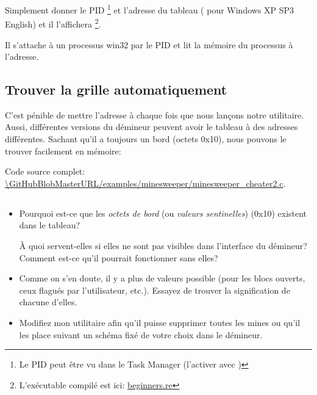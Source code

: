 

Simplement donner le \ac{PID}
\footnote{Le PID peut être vu dans le Task Manager
(l'activer avec )}
et l'adresse du tableau ( pour Windows XP SP3 English)
et il l'affichera
\footnote{L'exécutable compilé est ici:
\href{http://go.yurichev.com/17165}{beginners.re}}.

Il s'attache à un processus win32 par le \ac{PID} et lit la mémoire du processus
à l'adresse.

\subsection{Trouver la grille automatiquement}

C'est pénible de mettre l'adresse à chaque fois que nous lançons notre utilitaire.
Aussi, différentes versions du démineur peuvent avoir le tableau à des adresses différentes.
Sachant qu'il a toujours un bord (octets 0x10), nous pouvons le trouver facilement
en mémoire:



Code source complet: \url{\GitHubBlobMasterURL/examples/minesweeper/minesweeper_cheater2.c}.

\subsection{\Exercises}

\begin{itemize}

\item 
Pourquoi est-ce que les \emph{octets de bord} (ou \emph{valeurs sentinelles}) (0x10)
existent dans le tableau?

À quoi servent-elles si elles ne sont pas visibles dans l'interface du démineur?
Comment est-ce qu'il pourrait fonctionner sans elles?

\item 
Comme on s'en doute, il y a plus de valeurs possible (pour les blocs ouverts, ceux
flagués par l'utilisateur, etc.).
Essayez de trouver la signification de chacune d'elles.

\item 
Modifiez mon utilitaire afin qu'il puisse supprimer toutes les mines ou qu'il les
place suivant un schéma fixé de votre choix dans le démineur.

\end{itemize}
